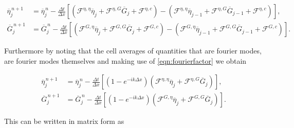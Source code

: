 \begin{align*}
\overline{\eta}_{j}^{\,n + 1} &=  \overline{\eta}^{\,n }_{j} - \frac{\Delta t}{\Delta x}  \left[ \left(\mathcal{F}^{\eta,\eta} \overline{\eta}_j  + \mathcal{F}^{\eta,G} \overline{G}_j + \mathcal{F}^{\eta,c} \right) - \left(\mathcal{F}^{\eta,\eta} \overline{\eta}_{j-1}  + \mathcal{F}^{\eta,G} \overline{G}_{j-1} + \mathcal{F}^{\eta,c} \right)  \right], \\
 \overline{G}^{\,n + 1}_{j} &= \overline{G}^{\,n }_{j} -\frac{\Delta t}{\Delta x}  \left[ \left(  \mathcal{F}^{G,\eta} \overline{\eta}_{j}  + \mathcal{F}^{G,G} \overline{G}_j + \mathcal{F}^{G,c} \right) - \left(  \mathcal{F}^{G,\eta} \overline{\eta}_{j-1}  + \mathcal{F}^{G,G} \overline{G}_{j-1} + \mathcal{F}^{G,c} \right) \right].
\end{align*}

	
Furthermore by noting that the cell averages of quantities that are fourier modes, are fourier modes themselves and making use of \eqref{eqn:fourierfactor} we obtain
	
\begin{align*}
\overline{\eta}_{j}^{\,n + 1} &=  \overline{\eta}^{\,n }_{j} - \frac{\Delta t}{\Delta x}  \left[ \left(1 - e^{-ik\Delta x}\right) \left(\mathcal{F}^{\eta,\eta} \overline{\eta}_j  + \mathcal{F}^{\eta,G} \overline{G}_j \right) \right], \\
\overline{G}^{\,n + 1}_{j} &= \overline{G}^{\,n }_{j} -\frac{\Delta t}{\Delta x}  \left[ \left(1 - e^{-ik\Delta x}\right)\left(  \mathcal{F}^{G,\eta} \overline{\eta}_{j}  + \mathcal{F}^{G,G} \overline{G}_j \right) \right].
\end{align*}


This can be written in matrix form as

